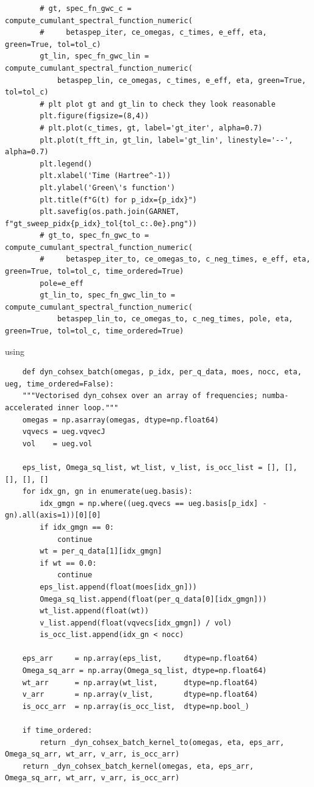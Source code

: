\begin{verbatim}
        # gt, spec_fn_gwc_c = compute_cumulant_spectral_function_numeric(
        #     betaspep_iter, ce_omegas, c_times, e_eff, eta, green=True, tol=tol_c)
        gt_lin, spec_fn_gwc_lin = compute_cumulant_spectral_function_numeric(
            betaspep_lin, ce_omegas, c_times, e_eff, eta, green=True, tol=tol_c)
        # plt plot gt and gt_lin to check they look reasonable
        plt.figure(figsize=(8,4))
        # plt.plot(c_times, gt, label='gt_iter', alpha=0.7)
        plt.plot(t_fft_in, gt_lin, label='gt_lin', linestyle='--', alpha=0.7)
        plt.legend()
        plt.xlabel('Time (Hartree^-1))
        plt.ylabel('Green\'s function')
        plt.title(f"G(t) for p_idx={p_idx}")
        plt.savefig(os.path.join(GARNET, f"gt_sweep_pidx{p_idx}_tol{tol_c:.0e}.png"))
        # gt_to, spec_fn_gwc_to = compute_cumulant_spectral_function_numeric(
        #     betaspep_iter_to, ce_omegas_to, c_neg_times, e_eff, eta, green=True, tol=tol_c, time_ordered=True)
        pole=e_eff
        gt_lin_to, spec_fn_gwc_lin_to = compute_cumulant_spectral_function_numeric(
            betaspep_lin_to, ce_omegas_to, c_neg_times, pole, eta, green=True, tol=tol_c, time_ordered=True)
\end{verbatim}
using
\begin{verbatim}
    def dyn_cohsex_batch(omegas, p_idx, per_q_data, moes, nocc, eta, ueg, time_ordered=False):
    """Vectorised dyn_cohsex over an array of frequencies; numba-accelerated inner loop."""
    omegas = np.asarray(omegas, dtype=np.float64)
    vqvecs = ueg.vqvecJ
    vol    = ueg.vol

    eps_list, Omega_sq_list, wt_list, v_list, is_occ_list = [], [], [], [], []
    for idx_gn, gn in enumerate(ueg.basis):
        idx_gmgn = np.where((ueg.qvecs == ueg.basis[p_idx] - gn).all(axis=1))[0][0]
        if idx_gmgn == 0:
            continue
        wt = per_q_data[1][idx_gmgn]
        if wt == 0.0:
            continue
        eps_list.append(float(moes[idx_gn]))
        Omega_sq_list.append(float(per_q_data[0][idx_gmgn]))
        wt_list.append(float(wt))
        v_list.append(float(vqvecs[idx_gmgn]) / vol)
        is_occ_list.append(idx_gn < nocc)

    eps_arr     = np.array(eps_list,     dtype=np.float64)
    Omega_sq_arr = np.array(Omega_sq_list, dtype=np.float64)
    wt_arr      = np.array(wt_list,      dtype=np.float64)
    v_arr       = np.array(v_list,       dtype=np.float64)
    is_occ_arr  = np.array(is_occ_list,  dtype=np.bool_)

    if time_ordered:
        return _dyn_cohsex_batch_kernel_to(omegas, eta, eps_arr, Omega_sq_arr, wt_arr, v_arr, is_occ_arr)
    return _dyn_cohsex_batch_kernel(omegas, eta, eps_arr, Omega_sq_arr, wt_arr, v_arr, is_occ_arr)
\end{verbatim}
